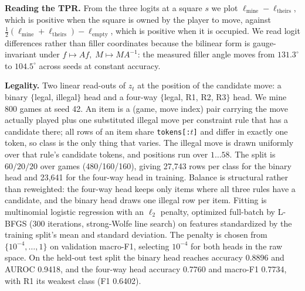 \documentclass{article}
\begin{document}
\textbf{Reading the TPR.} From the three logits at a square $s$ we plot $\ell_{\mathrm{mine}} -
\ell_{\mathrm{theirs}}$, which is positive when the square is owned by the player to move, against
$\tfrac{1}{2}(\ell_{\mathrm{mine}} + \ell_{\mathrm{theirs}}) - \ell_{\mathrm{empty}}$, which is positive when
it is occupied. We read logit differences rather than filler coordinates because the bilinear
form is gauge-invariant under $f \mapsto Af,\; M \mapsto MA^{-1}$: the measured filler angle
moves from $131.3^\circ$ to $104.5^\circ$ across seeds at constant accuracy.

\textbf{Legality.} Two linear read-outs of $z_t$ at the position of the candidate move: a binary
$\{$legal, illegal$\}$ head and a four-way $\{$legal, R1, R2, R3$\}$ head. We mine 800 games at
seed 42. An item is a (game, move index) pair carrying the move actually played plus one
substituted illegal move per constraint rule that has a candidate there; all rows of an item
share \texttt{tokens[:$t$]} and differ in exactly one token, so class is the only thing that
varies. The illegal move is drawn uniformly over that rule's candidate tokens, and positions run
over $1 \ldots 58$. The split is $60/20/20$ over games (480/160/160), giving 27,743 rows per
class for the binary head and 23,641 for the four-way head in training. Balance is structural
rather than reweighted: the four-way head keeps only items where all three rules have a
candidate, and the binary head draws one illegal row per item. Fitting is multinomial logistic
regression with an $\ell_2$ penalty, optimized full-batch by L-BFGS (300 iterations,
strong-Wolfe line search) on features standardized by the training split's mean and standard
deviation. The penalty is chosen from $\{10^{-4}, \ldots, 1\}$ on validation macro-F1, selecting
$10^{-4}$ for both heads in the raw space. On the held-out test split the binary head reaches accuracy 0.8896 and
AUROC 0.9418, and the four-way head accuracy 0.7760 and macro-F1 0.7734, with R1 its weakest
class (F1 0.6402).
\end{document}
